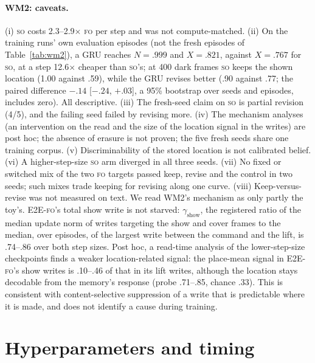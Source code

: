 \documentclass[11pt]{article}
\newcommand{\FO}{\textsc{fo}}
\newcommand{\SO}{\textsc{so}}
\begin{document}
\paragraph{WM2: caveats.} (i) \SO{} costs 2.3--2.9$\times$ \FO{} per step and was not compute-matched.
(ii) On the training runs' own evaluation episodes (not the fresh episodes of Table~\ref{tab:wm2}), a
GRU reaches $N=.999$ and $X=.821$, against $X=.767$ for \SO{}, at a step 12.6$\times$ cheaper than \SO's;
at 400 dark frames \SO{} keeps the shown location (1.00 against .59), while the GRU revises better
(.90 against .77; the paired difference $-.14$ [$-.24$, $+.03$], a 95\% bootstrap over seeds and episodes, includes
zero). All descriptive. (iii) The
fresh-seed claim on \SO{} is partial revision (4/5), and the failing seed failed by revising more.
(iv) The mechanism analyses (an intervention on the read and the size of the location signal in the
writes) are post hoc; the absence of erasure is not proven; the five fresh seeds share one training
corpus. (v) Discriminability of the stored location is not calibrated belief. (vi) A higher-step-size
\SO{} arm diverged in all three seeds. (vii) No fixed or switched mix of the two \FO{} targets passed
keep, revise and the control in two seeds; such mixes trade keeping for revising along one curve.
(viii) Keep-versus-revise was not measured on text. We read WM2's mechanism as only partly the
toy's. E2E-\FO's total show write is not starved: $\gamma_{\text{show}}$, the registered ratio of the
median update norm of writes targeting the show and cover frames to the median, over episodes, of
the largest write between the command and the lift, is .74--.86 over both step sizes. Post hoc, a
read-time analysis of the lower-step-size checkpoints finds a weaker location-related signal: the place-mean signal in E2E-\FO's show writes is .10--.46 of that in
its lift writes, although the location stays decodable from the memory's response (probe .71--.85,
chance .33). This is consistent with content-selective suppression of a write that is predictable
where it is made, and does not identify a cause during training.

\FloatBarrier

\section{Hyperparameters and timing}
\label{app:hparams}
\end{document}
